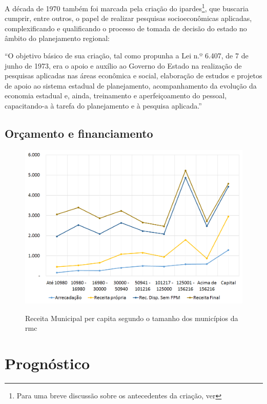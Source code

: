 	A década de 1970 também foi marcada pela criação do \gls{ipardes}\footnote{Para uma breve discussão sobre os antecedentes da criação, ver }, que buscaria cumprir, entre outros, o papel de realizar pesquisas socioeconômicas aplicadas, complexificando e qualificando o processo de tomada de decisão do estado no âmbito do planejamento regional:
	
	\begin{citacao}
		``O objetivo básico de sua criação, tal como propunha a Lei n.º 6.407, de 7 de junho de 1973, era o apoio e auxílio ao Governo do Estado na realização de pesquisas aplicadas nas áreas econômica e social, elaboração de estudos e projetos de apoio ao sistema estadual de planejamento, acompanhamento da evolução da economia estadual e, ainda, treinamento e aperfeiçoamento do pessoal, capacitando-a à tarefa do planejamento e à pesquisa aplicada.'' \cite[p. 2]{carleial2003a}
	\end{citacao}
	
	\section{Orçamento e financiamento}
		
	\begin{figure}
		\centering
		\caption{Receita Municipal per capita segundo o tamanho dos municípios da \gls{rmc}}
		\includegraphics[width=1.0\linewidth]{img/orcamento_A}
		\label{fig:orcamento}
	\end{figure}
	
	\chapter{Prognóstico} \label{sec:prognostico}
	
